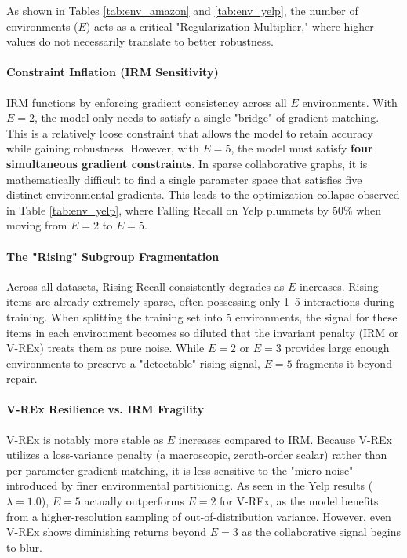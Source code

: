 \documentclass{article}
\begin{document}
As shown in Tables \ref{tab:env_amazon} and \ref{tab:env_yelp}, the number of environments ($E$) acts as a critical "Regularization Multiplier," where higher values do not necessarily translate to better robustness.

\paragraph{Constraint Inflation (IRM Sensitivity)}
IRM functions by enforcing gradient consistency across all $E$ environments. With $E=2$, the model only needs to satisfy a single "bridge" of gradient matching. This is a relatively loose constraint that allows the model to retain accuracy while gaining robustness. However, with $E=5$, the model must satisfy \textbf{four simultaneous gradient constraints}. In sparse collaborative graphs, it is mathematically difficult to find a single parameter space that satisfies five distinct environmental gradients. This leads to the optimization collapse observed in Table \ref{tab:env_yelp}, where Falling Recall on Yelp plummets by 50\% when moving from $E=2$ to $E=5$.

\paragraph{The "Rising" Subgroup Fragmentation}
Across all datasets, Rising Recall consistently degrades as $E$ increases. Rising items are already extremely sparse, often possessing only 1--5 interactions during training. When splitting the training set into 5 environments, the signal for these items in each environment becomes so diluted that the invariant penalty (IRM or V-REx) treats them as pure noise. While $E=2$ or $E=3$ provides large enough environments to preserve a "detectable" rising signal, $E=5$ fragments it beyond repair.

\paragraph{V-REx Resilience vs. IRM Fragility}
V-REx is notably more stable as $E$ increases compared to IRM. Because V-REx utilizes a loss-variance penalty (a macroscopic, zeroth-order scalar) rather than per-parameter gradient matching, it is less sensitive to the "micro-noise" introduced by finer environmental partitioning. As seen in the Yelp results ($\lambda=1.0$), $E=5$ actually outperforms $E=2$ for V-REx, as the model benefits from a higher-resolution sampling of out-of-distribution variance. However, even V-REx shows diminishing returns beyond $E=3$ as the collaborative signal begins to blur.
\end{document}
